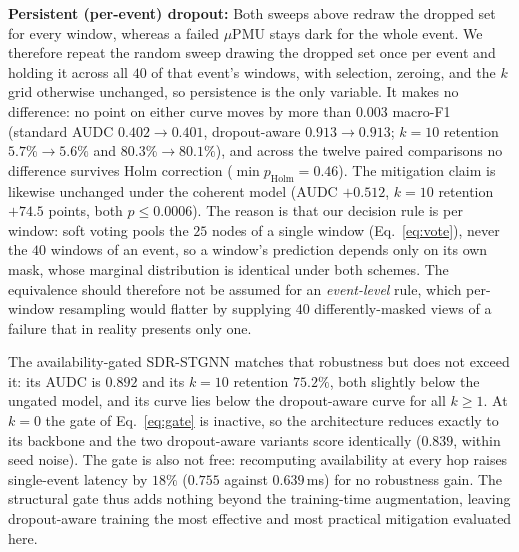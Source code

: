 \documentclass[3p,times,procedia]{elsarticle}
\begin{document}
\textbf{Persistent (per-event) dropout:} Both sweeps above redraw the dropped set for every window, whereas a failed $\mu$PMU stays dark for the whole event. We therefore repeat the random sweep drawing the dropped set once per event and holding it across all $40$ of that event's windows, with selection, zeroing, and the $k$ grid otherwise unchanged, so persistence is the only variable. It makes no difference: no point on either curve moves by more than $0.003$ macro-F1 (standard AUDC $0.402\!\to\!0.401$, dropout-aware $0.913\!\to\!0.913$; $k=10$ retention $5.7\%\!\to\!5.6\%$ and $80.3\%\!\to\!80.1\%$), and across the twelve paired comparisons no difference survives Holm correction ($\min p_{\text{Holm}}=0.46$). The mitigation claim is likewise unchanged under the coherent model (AUDC $+0.512$, $k=10$ retention $+74.5$ points, both $p\le0.0006$). The reason is that our decision rule is per window: soft voting pools the $25$ nodes of a single window (Eq.~\eqref{eq:vote}), never the $40$ windows of an event, so a window's prediction depends only on its own mask, whose marginal distribution is identical under both schemes. The equivalence should therefore not be assumed for an \emph{event-level} rule, which per-window resampling would flatter by supplying $40$ differently-masked views of a failure that in reality presents only one.

The availability-gated SDR-STGNN matches that robustness but does not exceed it: its AUDC is $0.892$ and its $k=10$ retention $75.2\%$, both slightly below the ungated model, and its curve lies below the dropout-aware curve for all $k\ge1$. At $k=0$ the gate of Eq.~\eqref{eq:gate} is inactive, so the architecture reduces exactly to its backbone and the two dropout-aware variants score identically ($0.839$, within seed noise). The gate is also not free: recomputing availability at every hop raises single-event latency by $18\%$ ($0.755$ against $0.639$\,ms) for no robustness gain. The structural gate thus adds nothing beyond the training-time augmentation, leaving dropout-aware training the most effective and most practical mitigation evaluated here.
\end{document}
